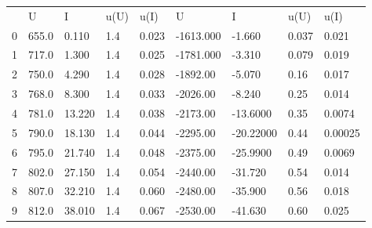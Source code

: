 \begin{tabular}{lllllllll}
 & U & I & u(U) & u(I) & U & I & u(U) & u(I) \\
0 & 655.0 & 0.110 & 1.4 & 0.023 & -1613.000 & -1.660 & 0.037 & 0.021 \\
1 & 717.0 & 1.300 & 1.4 & 0.025 & -1781.000 & -3.310 & 0.079 & 0.019 \\
2 & 750.0 & 4.290 & 1.4 & 0.028 & -1892.00 & -5.070 & 0.16 & 0.017 \\
3 & 768.0 & 8.300 & 1.4 & 0.033 & -2026.00 & -8.240 & 0.25 & 0.014 \\
4 & 781.0 & 13.220 & 1.4 & 0.038 & -2173.00 & -13.6000 & 0.35 & 0.0074 \\
5 & 790.0 & 18.130 & 1.4 & 0.044 & -2295.00 & -20.22000 & 0.44 & 0.00025 \\
6 & 795.0 & 21.740 & 1.4 & 0.048 & -2375.00 & -25.9900 & 0.49 & 0.0069 \\
7 & 802.0 & 27.150 & 1.4 & 0.054 & -2440.00 & -31.720 & 0.54 & 0.014 \\
8 & 807.0 & 32.210 & 1.4 & 0.060 & -2480.00 & -35.900 & 0.56 & 0.018 \\
9 & 812.0 & 38.010 & 1.4 & 0.067 & -2530.00 & -41.630 & 0.60 & 0.025 \\
\end{tabular}
